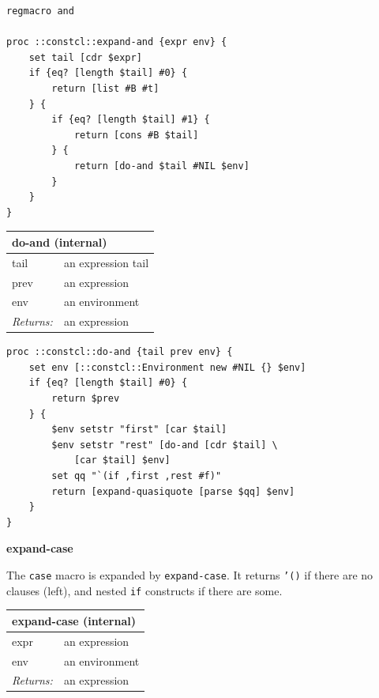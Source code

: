 \documentclass[twoside,9pt]{report}
\begin{document}
\noindent\makebox[\linewidth]{\rule{\linewidth}{0.4pt}}
\begin{lstlisting}
regmacro and
 
proc ::constcl::expand-and {expr env} {
    set tail [cdr $expr]
    if {eq? [length $tail] #0} {
        return [list #B #t]
    } {
        if {eq? [length $tail] #1} {
            return [cons #B $tail]
        } {
            return [do-and $tail #NIL $env]
        }
    }
}
\end{lstlisting}
\noindent\makebox[\linewidth]{\rule{\linewidth}{0.4pt}}
\begin{tabular}{ |l l| }
\hline
\multicolumn{2}{|l|}{do-and (internal)} \\
\hline
tail & an expression tail \\
prev & an expression \\
env & an environment \\
\textit{Returns:} & an expression \\
\hline
\end{tabular}

\noindent\makebox[\linewidth]{\rule{\linewidth}{0.4pt}}
\begin{lstlisting}
proc ::constcl::do-and {tail prev env} {
    set env [::constcl::Environment new #NIL {} $env]
    if {eq? [length $tail] #0} {
        return $prev
    } {
        $env setstr "first" [car $tail]
        $env setstr "rest" [do-and [cdr $tail] \
            [car $tail] $env]
        set qq "`(if ,first ,rest #f)"
        return [expand-quasiquote [parse $qq] $env]
    }
}
\end{lstlisting}
\noindent\makebox[\linewidth]{\rule{\linewidth}{0.4pt}}

\textbf{expand-case}


The \texttt{case} macro is expanded by \texttt{expand-case}. It returns \texttt{'()} if there are no clauses (left), and nested \texttt{if} constructs if there are some.

\begin{tabular}{ |l l| }
\hline
\multicolumn{2}{|l|}{expand-case (internal)} \\
\hline
expr & an expression \\
env & an environment \\
\textit{Returns:} & an expression \\
\hline
\end{tabular}
\end{document}
